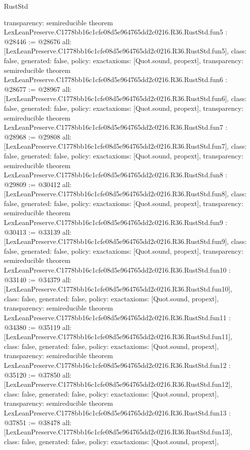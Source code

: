 \begin{lexlean}{RustStd}
\begin{coremodule}
{  transparency: semireducible
}
theorem LexLeanPreserve.C1778bb16c1cfe08d5e964765dd2c0216.R36.RustStd.fun5 : @28446 := @28676 {
  all: [LexLeanPreserve.C1778bb16c1cfe08d5e964765dd2c0216.R36.RustStd.fun5],
  class: false,
  generated: false,
  policy: exact{axioms: [Quot.sound, propext]},
  transparency: semireducible
}
theorem LexLeanPreserve.C1778bb16c1cfe08d5e964765dd2c0216.R36.RustStd.fun6 : @28677 := @28967 {
  all: [LexLeanPreserve.C1778bb16c1cfe08d5e964765dd2c0216.R36.RustStd.fun6],
  class: false,
  generated: false,
  policy: exact{axioms: [Quot.sound, propext]},
  transparency: semireducible
}
theorem LexLeanPreserve.C1778bb16c1cfe08d5e964765dd2c0216.R36.RustStd.fun7 : @28968 := @29808 {
  all: [LexLeanPreserve.C1778bb16c1cfe08d5e964765dd2c0216.R36.RustStd.fun7],
  class: false,
  generated: false,
  policy: exact{axioms: [Quot.sound, propext]},
  transparency: semireducible
}
theorem LexLeanPreserve.C1778bb16c1cfe08d5e964765dd2c0216.R36.RustStd.fun8 : @29809 := @30412 {
  all: [LexLeanPreserve.C1778bb16c1cfe08d5e964765dd2c0216.R36.RustStd.fun8],
  class: false,
  generated: false,
  policy: exact{axioms: [Quot.sound, propext]},
  transparency: semireducible
}
theorem LexLeanPreserve.C1778bb16c1cfe08d5e964765dd2c0216.R36.RustStd.fun9 : @30413 := @33139 {
  all: [LexLeanPreserve.C1778bb16c1cfe08d5e964765dd2c0216.R36.RustStd.fun9],
  class: false,
  generated: false,
  policy: exact{axioms: [Quot.sound, propext]},
  transparency: semireducible
}
theorem LexLeanPreserve.C1778bb16c1cfe08d5e964765dd2c0216.R36.RustStd.fun10 : @33140 := @34379 {
  all: [LexLeanPreserve.C1778bb16c1cfe08d5e964765dd2c0216.R36.RustStd.fun10],
  class: false,
  generated: false,
  policy: exact{axioms: [Quot.sound, propext]},
  transparency: semireducible
}
theorem LexLeanPreserve.C1778bb16c1cfe08d5e964765dd2c0216.R36.RustStd.fun11 : @34380 := @35119 {
  all: [LexLeanPreserve.C1778bb16c1cfe08d5e964765dd2c0216.R36.RustStd.fun11],
  class: false,
  generated: false,
  policy: exact{axioms: [Quot.sound, propext]},
  transparency: semireducible
}
theorem LexLeanPreserve.C1778bb16c1cfe08d5e964765dd2c0216.R36.RustStd.fun12 : @35120 := @37850 {
  all: [LexLeanPreserve.C1778bb16c1cfe08d5e964765dd2c0216.R36.RustStd.fun12],
  class: false,
  generated: false,
  policy: exact{axioms: [Quot.sound, propext]},
  transparency: semireducible
}
theorem LexLeanPreserve.C1778bb16c1cfe08d5e964765dd2c0216.R36.RustStd.fun13 : @37851 := @38478 {
  all: [LexLeanPreserve.C1778bb16c1cfe08d5e964765dd2c0216.R36.RustStd.fun13],
  class: false,
  generated: false,
  policy: exact{axioms: [Quot.sound, propext]},
}
\end{coremodule}
\end{lexlean}
